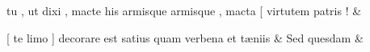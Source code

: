 \documentclass[12pt,onecolumn,twoside,a4paper]{memoir}
\begin{document}
\begin{pairs}
\begin{Leftside}
                              tu
                              ,
                              ut
                              dixi
                              ,
                              macte
                              his
                              armisque
                              {armisque}
                              ,
                              macta
                              [
                              virtutem
                              patris
                              ! \&
                         \stanza {}
                     
                              [
                              te
                              limo
                              ]
                              decorare
                              est
                              satius
                              quam
                              verbena
                              et
                              tæniis \&
                         \stanza {}
                     Sed
                              quesdam
                            \&
                     
                  \endnumbering
		\end{Leftside}
                  \begin{Rightside}
			\beginnumbering
			\numberstanzafalse
                     

\end{Rightside}
\end{pairs}
\end{document}
